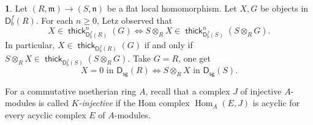 \documentclass{amsart}
\newcommand{\n}{\mathfrak{n}}
\newcommand{\D}{\mathsf{D}}
\newcommand{\0}{{\bf{0}}}
\newcommand{\m}{\mathfrak{m}}
\DeclareMathOperator{\Hom}{Hom}
\DeclareMathOperator{\thick}{\mathsf{thick}}
\newcommand{\sg}{\mathsf{sg}}
\theoremstyle{definition}
\newtheorem{chunk}[theorem]{}
\begin{document}
\begin{chunk}\label{Letz}
     Let $(R,\m)\rightarrow (S,\n)$ be a flat local homomorphism. Let $X,G$ be objects in $\D^f_b(R)$. For each $n\geq 0$, Letz \cite[Corollary 2.11]{Letz} observed that
     $$
     X\in \thick^n_{\D^f_b(R)}(G)\iff S\otimes_R X\in \thick^n_{\D^f_b(S)}(S\otimes_R G).
     $$
     In particular, $X\in\thick_{\D^f_b(R)}(G)$ if and only if $S\otimes_R X\in \thick_{\D^f_b(S)}(S\otimes_R G)$. Take $G=R$, one get
     $$
     X=0 \text{ in }\D_{\sg}(R) \iff S\otimes_R X \text{ in } \D_{\sg}(S).
     $$
\end{chunk}
For a commutative noetherian ring $A$, recall that a complex $J$ of injective $A$-modules is called \emph{$K$-injective} if the Hom complex
$
\Hom_A(E,J)
$
is acyclic for every acyclic complex $E$ of $A$-modules. 
\end{document}
